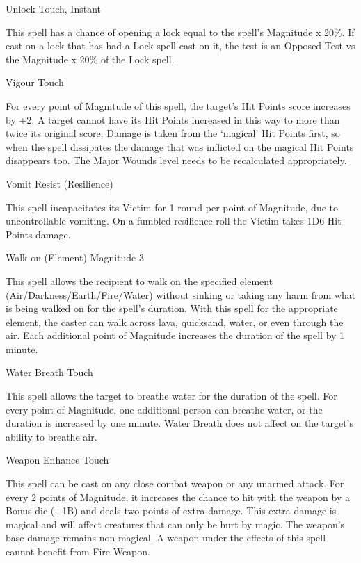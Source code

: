 \begin{rpg-spell}
{Unlock}
{Touch, Instant}

This spell has a chance of opening a lock equal to the spell’s Magnitude x 20\%. If cast on a lock that has had a Lock spell cast on it, the test is an Opposed Test vs the Magnitude x 20\% of the Lock spell.
\end{rpg-spell}


\begin{rpg-spell}
{Vigour}
{Touch}

For every point of Magnitude of this spell, the target’s Hit Points score increases by +2. A target cannot have its Hit Points increased in this way to more than twice its original score. Damage is taken from the ‘magical’ Hit Points first, so when the spell dissipates the damage that was inflicted on the magical Hit Points disappears too. The Major Wounds level needs to be recalculated appropriately.
\end{rpg-spell}


\begin{rpg-spell}
{Vomit}
{Resist (Resilience)}

This spell incapacitates its Victim for 1 round per point of Magnitude, due to uncontrollable vomiting. On a fumbled resilience roll the Victim takes 1D6 Hit Points damage.
\end{rpg-spell}


\begin{rpg-spell}
{Walk on (Element)}
{Magnitude 3}

This spell allows the recipient to walk on the specified element (Air/Darkness/Earth/Fire/Water) without sinking or taking any harm from what is being walked on for the spell’s duration. With this spell for the appropriate element, the caster can walk across lava, quicksand, water, or even through the air. Each additional point of Magnitude increases the duration of the spell by 1 minute.
\end{rpg-spell}


\begin{rpg-spell}
{Water Breath}
{Touch}

This spell allows the target to breathe water for the duration of the spell. For every point of Magnitude, one additional person can breathe water, or the duration is increased by one minute. Water Breath does not affect on the target’s ability to breathe air.
\end{rpg-spell}


\begin{rpg-spell}
{Weapon Enhance}
{Touch}

This spell can be cast on any close combat weapon or any unarmed attack. For every 2 points of Magnitude, it increases the chance to hit with the weapon by a Bonus die (+1B) and deals two points of extra damage. This extra damage is magical and will affect creatures that can only be hurt by magic. The weapon’s base damage remains non-magical. A weapon under the effects of this spell cannot benefit from Fire Weapon.
\end{rpg-spell}


